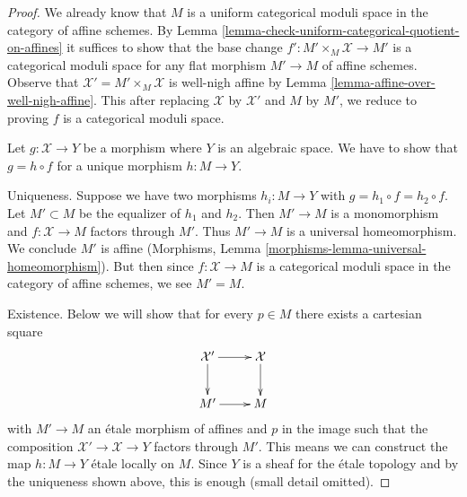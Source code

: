 \documentclass{stacks-project}
\theoremstyle{plain}
\theoremstyle{definition}
\theoremstyle{remark}
\numberwithin{equation}{subsection}
\begin{document}
\begin{proof}
We already know that $M$ is a uniform categorical moduli space
in the category of affine schemes. By
Lemma \ref{lemma-check-uniform-categorical-quotient-on-affines}
it suffices to show that the base change
$f' : M' \times_M \mathcal{X} \to M'$
is a categorical moduli space for any flat morphism
$M' \to M$ of affine schemes.
Observe that $\mathcal{X}' = M' \times_M \mathcal{X}$ is well-nigh affine by
Lemma \ref{lemma-affine-over-well-nigh-affine}.
This after replacing $\mathcal{X}$ by $\mathcal{X}'$
and $M$ by $M'$, we reduce to proving $f$ is a categorical
moduli space.

\medskip\noindent
Let $g : \mathcal{X} \to Y$ be a morphism where $Y$ is an algebraic space.
We have to show that $g = h \circ f$ for a unique morphism $h : M \to Y$.

\medskip\noindent
Uniqueness. Suppose we have two morphisms $h_i : M \to Y$ with
$g = h_1 \circ f = h_2 \circ f$. Let $M' \subset M$ be the equalizer
of $h_1$ and $h_2$. Then $M' \to M$ is a monomorphism and
$f : \mathcal{X} \to M$ factors through $M'$. Thus $M' \to M$
is a universal homeomorphism. We conclude $M'$ is affine
(Morphisms, Lemma \ref{morphisms-lemma-universal-homeomorphism}).
But then since $f : \mathcal{X} \to M$
is a categorical moduli space in the category of affine schemes,
we see $M' = M$.

\medskip\noindent
Existence. Below we will show that for every $p \in M$ there exists
a cartesian square
$$
\xymatrix{
\mathcal{X}' \ar[r] \ar[d] & \mathcal{X} \ar[d] \\
M' \ar[r] & M
}
$$
with $M' \to M$ an \'etale morphism of affines and $p$ in the image such that
the composition $\mathcal{X}' \to \mathcal{X} \to Y$ factors through $M'$.
This means we can construct the map $h : M \to Y$ \'etale locally on $M$.
Since $Y$ is a sheaf for the \'etale topology and by the uniqueness shown
above, this is enough (small detail omitted).


\end{proof}
\end{document}
